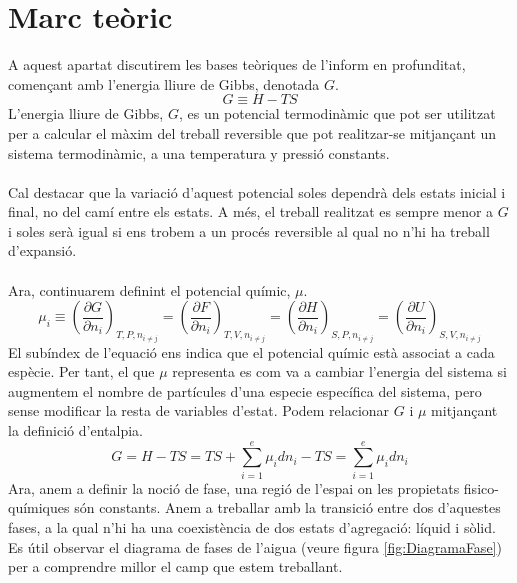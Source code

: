 \documentclass{article}
\begin{document}
\section{Marc teòric}
    A aquest apartat discutirem les bases teòriques de l'inform en profunditat, començant amb l'energia lliure de Gibbs, denotada $G$.
    \begin{equation}\label{eq:gibbs}
    G\equiv H-TS    
    \end{equation}
    L'energia lliure de Gibbs, $G$, es un potencial termodinàmic que pot ser utilitzat per a calcular el màxim del treball reversible que pot realitzar-se mitjançant un sistema termodinàmic, a una temperatura y pressió constants.\\ \\Cal destacar que la variació d'aquest potencial soles dependrà dels estats inicial i final, no del camí entre els estats. A més, el treball realitzat es sempre menor a $G$ i soles serà igual si ens trobem a un procés reversible al qual no n'hi ha treball d'expansió. \\ \\Ara, continuarem definint el potencial químic, $\mu$.
    \begin{equation}\label{eq:potencial}
    \mu_i \equiv \left( \frac{\partial G}{\partial n_i} \right)_{T,P,n_{i\neq j}} = \left( \frac{\partial F}{\partial n_i} \right)_{T,V,n_{i\neq j}} = \left( \frac{\partial H}{\partial n_i} \right)_{S,P,n_{i\neq j}} = \left( \frac{\partial U}{\partial n_i} \right)_{S,V,n_{i\neq j}}
    \end{equation}
    El subíndex de l'equació ens indica que el potencial químic està associat a cada espècie. Per tant, el que $\mu$ representa es com va a cambiar l'energia del sistema si augmentem el nombre de partícules d'una especie específica del sistema, pero sense modificar la resta de variables d'estat. Podem relacionar $G$ i $\mu$ mitjançant la definició d'entalpia.
    \begin{equation}\label{eq:entalpia}
        G = H - TS = TS + \sum_{i=1}^{e}\mu_idn_i - TS = \sum_{i=1}^{e}\mu_idn_i
    \end{equation}
    \clearpage
    Ara, anem a definir la noció de fase, una regió de l'espai on les propietats fisico-químiques són constants. Anem a treballar amb la transició entre dos d'aquestes fases, a la qual n'hi ha una coexistència de dos estats d'agregació: líquid i sòlid. Es útil observar el diagrama de fases de l'aigua (veure figura \ref{fig:DiagramaFase}) per a comprendre millor el camp que estem treballant.
\end{document}
